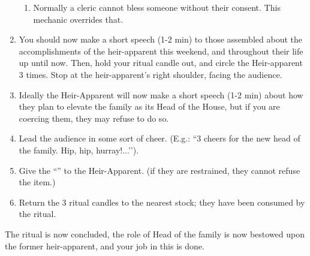 \documentclass[green]{GL2020}
\begin{document}
\begin{enumerate}
\begin{enumerate}
      \item Normally a cleric cannot bless someone without their consent. This mechanic overrides that.
    \end{enumerate}
  \item You should now make a short speech (1-2 min) to those assembled about the accomplishments of the heir-apparent this weekend, and throughout their life up until now. Then, hold your ritual candle out, and circle the Heir-apparent 3 times. Stop at the heir-apparent’s right shoulder, facing the audience.
  \item Ideally the Heir-Apparent will now make a short speech (1-2 min) about how they plan to elevate the \cFaledonParent{\formal} family as its Head of the House, but if you are coercing them, they may refuse to do so.
  \item Lead the audience in some sort of cheer. (E.g.: ``3 cheers for the new head of the \cFaledonParent{\formal} family. Hip, hip, hurray!...’’).
  \item Give the ``\iFaledonRing{}'' to the Heir-Apparent. (if they are restrained, they cannot refuse the item.)
  \item Return the 3 ritual candles to the nearest stock; they have been consumed  by the ritual.
\end{enumerate}

The ritual is now concluded, the role of Head of the \cFaledonParent{\formal} family is now bestowed upon the former heir-apparent, and your job in this is done.
\end{document}
